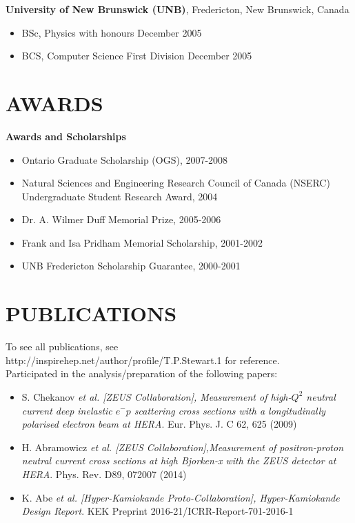 \documentclass[margin]{res}
\begin{document}
\begin{resume}
{\bf University of New Brunswick (UNB)}, Fredericton, New Brunswick, Canada \\

\begin{itemize} \itemsep -2pt  %
\item BSc, Physics with honours \hfill December 2005
\item BCS, Computer Science First Division \hfill December 2005
\end{itemize}

\section{AWARDS}

\textbf{Awards and Scholarships}\\
\begin{itemize} \itemsep -2pt
\item Ontario Graduate Scholarship (OGS), 2007-2008
\item Natural Sciences and Engineering Research Council of Canada (NSERC) Undergraduate Student Research Award, 2004
\item Dr. A. Wilmer Duff Memorial Prize, 2005-2006
\item Frank and  Isa  Pridham Memorial Scholarship, 2001-2002
\item UNB Fredericton Scholarship Guarantee, 2000-2001
\end{itemize}


\section{PUBLICATIONS}

To see all publications, see\\
http://inspirehep.net/author/profile/T.P.Stewart.1 for reference.\\
Participated in the analysis/preparation of the following papers:
\begin{itemize} \itemsep -2pt
\item S. Chekanov \textit{et al. [ZEUS Collaboration], Measurement of high-$Q^2$ neutral current deep inelastic $e^− p$ scattering cross sections with a longitudinally polarised electron beam at HERA}. Eur. Phys. J. C 62, 625 (2009)
\item H. Abramowicz \textit{et al. [ZEUS Collaboration],Measurement of positron-proton neutral current cross sections at high Bjorken-x with the ZEUS detector at HERA}. Phys. Rev. D89, 072007 (2014)
\item K. Abe \textit{et al. [Hyper-Kamiokande Proto-Collaboration], Hyper-Kamiokande Design Report}. KEK Preprint 2016-21/ICRR-Report-701-2016-1
\end{itemize}


\end{resume}
\end{document}
